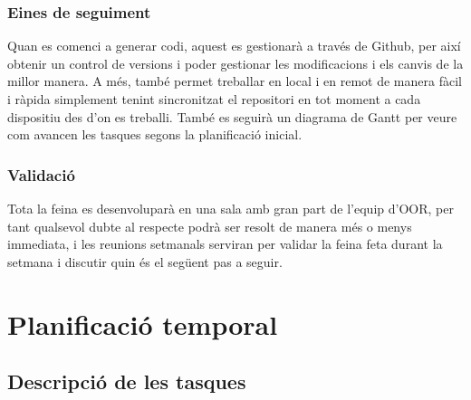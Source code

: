 \documentclass{article}
\begin{document}
\begin{enumerate}
\begin{enumerate}
\subsubsection{Eines de seguiment}
Quan es comenci a generar codi, aquest es gestionarà a través de Github, per així obtenir un control de versions i poder gestionar les modificacions i els canvis de la millor manera. A més, també permet treballar en local i en remot de manera fàcil i ràpida simplement tenint sincronitzat el repositori en tot moment a cada dispositiu des d’on es treballi.
També es seguirà un diagrama de Gantt per veure com avancen les tasques segons la planificació inicial.
\subsubsection{Validació}
Tota la feina es desenvoluparà en una sala amb gran part de l’equip d’OOR, per tant qualsevol dubte al respecte podrà ser resolt de manera més o menys immediata, i les reunions setmanals serviran per validar la feina feta durant la setmana i discutir quin és el següent pas a seguir.


\section{Planificació temporal}
\subsection{Descripció de les tasques}

\end{enumerate}
\end{enumerate}
\end{document}

